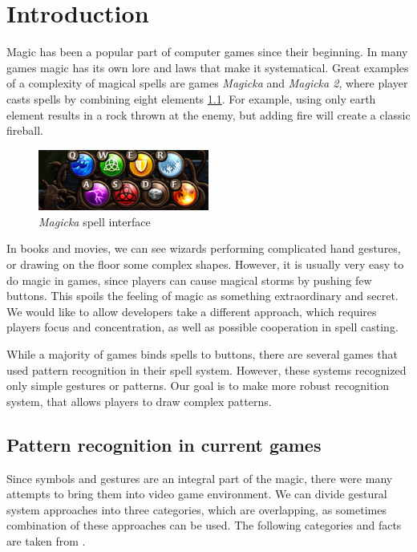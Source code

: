 \chapter{Introduction}
\label{chap:gf}

Magic has been a popular part of computer games since their beginning. In many games magic has its own lore and laws that make it systematical. Great examples of a complexity of magical spells are games \emph{Magicka} and \emph{Magicka 2}, where player casts spells by combining eight elements \ref{fig:magicka}. For example, using only earth element results in a rock thrown at the enemy, but adding fire will create a classic fireball.
\begin{figure}[!htb]
  \centering
  \label{fig:magicka}
    \includegraphics[width=0.5\textwidth]{ext/magicka.png}
    \caption{\emph{Magicka} spell interface}
\end{figure}

In books and movies, we can see wizards performing complicated hand gestures, or drawing on the floor some complex shapes. However, it is usually very easy to do magic in games, since players can cause magical storms by pushing few buttons. This spoils the feeling of magic as something extraordinary and secret. We would like to allow developers take a different approach, which requires players focus and concentration, as well as possible cooperation in spell casting.

While a majority of games binds spells to buttons, there are several games that used pattern recognition in their spell system. However, these systems recognized only simple gestures or patterns. Our goal is to make more robust recognition system, that allows players to draw complex patterns.

\section{Pattern recognition in current games}

Since symbols and gestures are an integral part of the magic, there were many attempts to bring them into video game environment. We can divide gestural system approaches into three categories, which are overlapping, as sometimes combination of these approaches can be used. The following categories and facts are taken from \cite{gameMagic}.

